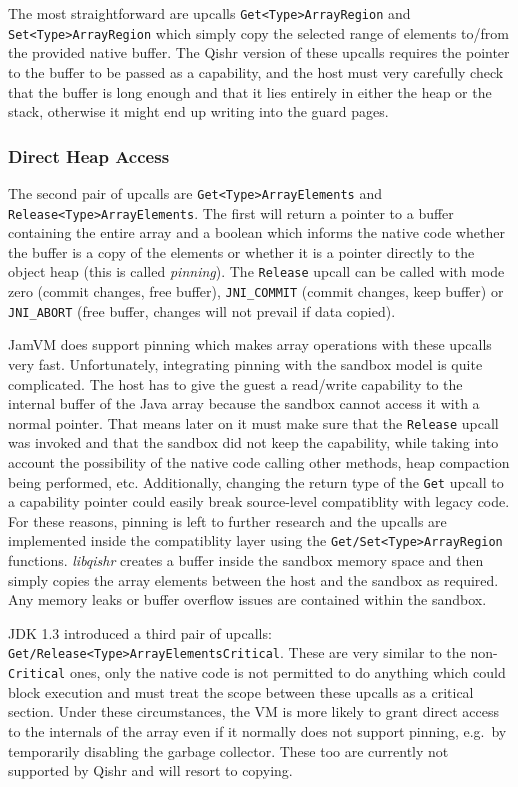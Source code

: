 \documentclass[a4paper,12pt,twoside,openright]{report}
\newcommand{\tool}[1]{\emph{#1}}
\newcommand{\lib}[1]{\tool{lib#1}}
\begin{document}
The most straightforward are upcalls \texttt{Get\-<Type>\-Array\-Region} and \texttt{Set\-<Type>\-Array\-Region} which simply copy the selected range of elements to/from the provided native buffer. The Qishr version of these upcalls requires the pointer to the buffer to be passed as a capability, and the host must very carefully check that the buffer is long enough and that it lies entirely in either the heap or the stack, otherwise it might end up writing into the guard pages. 

\subsubsection{Direct Heap Access}

The second pair of upcalls are \texttt{Get\-<Type>\-Array\-Elements} and \texttt{Release\-<Type>\-Array\-Elements}. The first will return a pointer to a buffer containing the entire array and a boolean which informs the native code whether the buffer is a copy of the elements or whether it is a pointer directly to the object heap (this is called \emph{pinning}). The \texttt{Release} upcall can be called with mode zero (commit changes, free buffer), \texttt{JNI\_COMMIT} (commit changes, keep buffer) or \texttt{JNI\_ABORT} (free buffer, changes will not prevail if data copied). 

JamVM does support pinning which makes array operations with these upcalls very fast. Unfortunately, integrating pinning with the sandbox model is quite complicated. The host has to give the guest a read/write capability to the internal buffer of the Java array because the sandbox cannot access it with a normal pointer. That means later on it must make sure that the \texttt{Release} upcall was invoked and that the sandbox did not keep the capability, while taking into account the possibility of the native code calling other methods, heap compaction being performed, etc. Additionally, changing the return type of the \texttt{Get} upcall to a capability pointer could easily break source-level compatiblity with legacy code. For these reasons, pinning is left to further research and the upcalls are implemented inside the compatiblity layer using the \texttt{Get/Set\-<Type>\-Array\-Region} functions. \lib{qishr} creates a buffer inside the sandbox memory space and then simply copies the array elements between the host and the sandbox as required. Any memory leaks or buffer overflow issues are contained within the sandbox.

\label{ArraysCriticalSection}
JDK 1.3 introduced a third pair of upcalls: \texttt{Get/Release\-<Type>\-Array\-ElementsCritical}. These are very similar to the non-\texttt{Critical} ones, only the native code is not permitted to do anything which could block execution and must treat the scope between these upcalls as a critical section. Under these circumstances, the VM is more likely to grant direct access to the internals of the array even if it normally does not support pinning, e.g.\ by temporarily disabling the garbage collector. These too are currently not supported by Qishr and will resort to copying.
\end{document}

